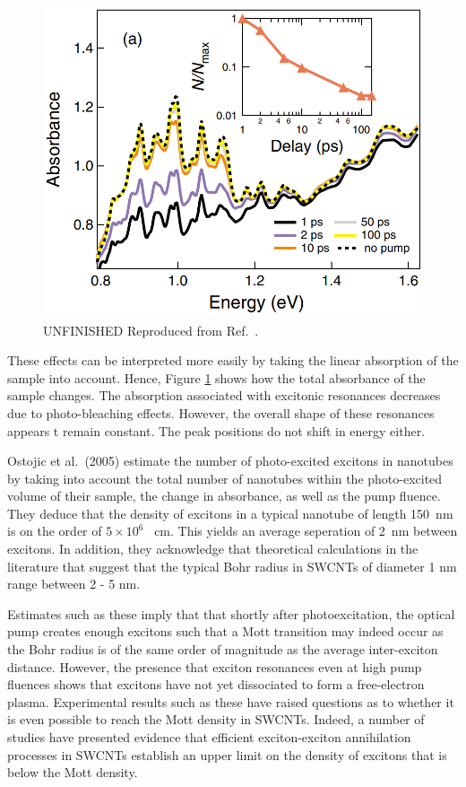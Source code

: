 \begin{figure}[ht]
	\centering
	\includegraphics[scale=1.2]{images/chapter_prior_works/total_abs_gordana_2005}
	\caption{{\color{red} UNFINISHED} Reproduced from Ref.\ \cite{ostojic2005stability}.}
	\label{fig:total_abs_gordana_2005}
\end{figure}


These effects can be interpreted more easily by taking the linear absorption of the sample into account. Hence, Figure \ref{fig:total_abs_gordana_2005} shows how the total absorbance of the sample changes. The absorption associated with excitonic resonances decreases due to photo-bleaching effects. However, the overall shape of these resonances appears t remain constant. The peak positions do not shift in energy either.

Ostojic et al.\ (2005) estimate the number of photo-excited excitons in nanotubes by taking into account the total number of nanotubes within the photo-excited volume of their sample, the change in absorbance, as well as the pump fluence. They deduce that the density of excitons in a typical nanotube of length \SI{150}{\nm} is on the order of $5 \times 10^6$ \si{\per\cm}. This yields an average seperation of \SI{2}{\nm} between excitons. In addition, they acknowledge that theoretical calculations in the literature that suggest that the typical Bohr radius in SWCNTs of diameter 1 nm range between 2 - 5 \si{\nm}.

Estimates such as these imply that that shortly after photoexcitation, the optical pump creates enough excitons such that a Mott transition may indeed occur as the Bohr radius is of the same order of magnitude as the average inter-exciton distance. However, the presence that exciton resonances even at high pump fluences shows that excitons have not yet dissociated to form a free-electron plasma. Experimental results such as these have raised questions as to whether it is even possible to reach the Mott density in SWCNTs. Indeed, a number of studies have presented evidence that efficient exciton-exciton annihilation processes in SWCNTs establish an upper limit on the density of excitons that is below the Mott density.



